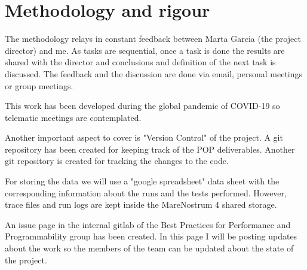 \section{Methodology and rigour}

\justify
The methodology relays in constant feedback between Marta Garcia (the project director) and me. As tasks are sequential, once a task is done the results are shared with the director and conclusions and definition of the next task is discussed. The feedback and the discussion are done via email, personal meetings or group meetings.

\justify
This work has been developed during the global pandemic of COVID-19 so telematic meetings are contemplated.

\justify
Another important aspect to cover is "Version Control" of the project. A git repository has been created for keeping track of the POP deliverables. Another git repository is created for tracking the changes to the code.

\justify
For storing the data we will use a "google  spreadsheet" data sheet with the corresponding information about the runs and the tests performed. However, trace files and run logs are kept inside the MareNostrum 4 shared storage.

\justify
An issue page in the internal gitlab of the Best Practices for Performance and Programmability group has been created. In this page I will be posting updates about the work so the members of the team can be updated about the state of the project.

\clearpage
